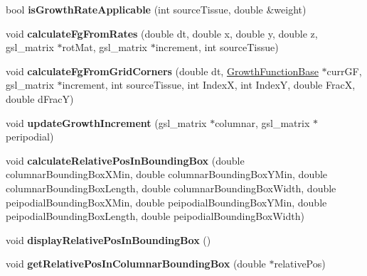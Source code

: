 \begin{DoxyCompactItemize}
\item 
\hypertarget{classShapeBase_a7c429bc57f1b16e3e1d4f2bb98360298}{}bool {\bfseries is\+Growth\+Rate\+Applicable} (int source\+Tissue, double \&weight)\label{classShapeBase_a7c429bc57f1b16e3e1d4f2bb98360298}

\item 
\hypertarget{classShapeBase_a33c9507a7e08fd529b28f70e62dfb33e}{}void {\bfseries calculate\+Fg\+From\+Rates} (double dt, double x, double y, double z, gsl\+\_\+matrix $\ast$rot\+Mat, gsl\+\_\+matrix $\ast$increment, int source\+Tissue)\label{classShapeBase_a33c9507a7e08fd529b28f70e62dfb33e}

\item 
\hypertarget{classShapeBase_ad158010ec26f607c4695aa7a0b767d73}{}void {\bfseries calculate\+Fg\+From\+Grid\+Corners} (double dt, \hyperlink{classGrowthFunctionBase}{Growth\+Function\+Base} $\ast$curr\+G\+F, gsl\+\_\+matrix $\ast$increment, int source\+Tissue, int Index\+X, int Index\+Y, double Frac\+X, double d\+Frac\+Y)\label{classShapeBase_ad158010ec26f607c4695aa7a0b767d73}

\item 
\hypertarget{classShapeBase_a009b5aed1c546db5e517f9f33f67b066}{}void {\bfseries update\+Growth\+Increment} (gsl\+\_\+matrix $\ast$columnar, gsl\+\_\+matrix $\ast$peripodial)\label{classShapeBase_a009b5aed1c546db5e517f9f33f67b066}

\item 
\hypertarget{classShapeBase_a3d71461730bfc221c8dcf8e4a7e31b3d}{}void {\bfseries calculate\+Relative\+Pos\+In\+Bounding\+Box} (double columnar\+Bounding\+Box\+X\+Min, double columnar\+Bounding\+Box\+Y\+Min, double columnar\+Bounding\+Box\+Length, double columnar\+Bounding\+Box\+Width, double peipodial\+Bounding\+Box\+X\+Min, double peipodial\+Bounding\+Box\+Y\+Min, double peipodial\+Bounding\+Box\+Length, double peipodial\+Bounding\+Box\+Width)\label{classShapeBase_a3d71461730bfc221c8dcf8e4a7e31b3d}

\item 
\hypertarget{classShapeBase_ae5e17514271f121498ed12cebae3aebe}{}void {\bfseries display\+Relative\+Pos\+In\+Bounding\+Box} ()\label{classShapeBase_ae5e17514271f121498ed12cebae3aebe}

\item 
\hypertarget{classShapeBase_aa741d2a88ca8107af26816e467adc8ba}{}void {\bfseries get\+Relative\+Pos\+In\+Columnar\+Bounding\+Box} (double $\ast$relative\+Pos)\label{classShapeBase_aa741d2a88ca8107af26816e467adc8ba}


\end{DoxyCompactItemize}
